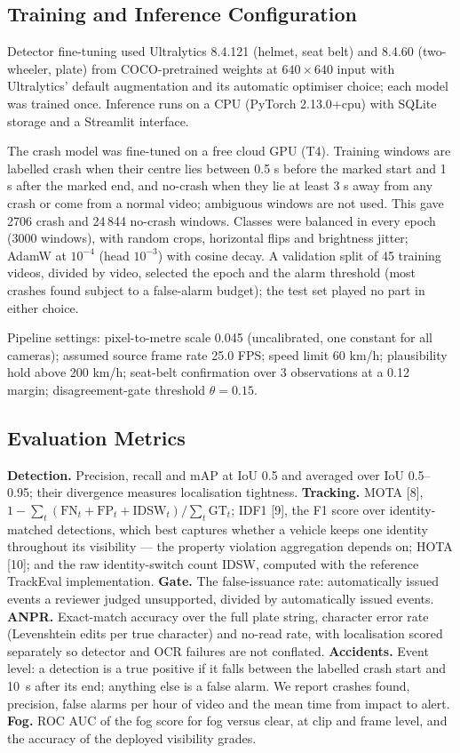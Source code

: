 \documentclass[10pt,a4paper,twocolumn]{article}
\begin{document}
\subsection{Training and Inference Configuration}
Detector fine-tuning used Ultralytics 8.4.121 (helmet, seat belt) and 8.4.60 (two-wheeler, plate) from COCO-pretrained
weights at $640\times640$ input with Ultralytics' default augmentation and its automatic optimiser choice; each model
was trained once. Inference runs on a CPU (PyTorch 2.13.0+cpu) with SQLite storage and a Streamlit interface.

The crash model was fine-tuned on a free cloud GPU (T4). Training windows are labelled crash when their centre lies
between 0.5 s before the marked start and 1 s after the marked end, and no-crash when they lie at least 3 s away from
any crash or come from a normal video; ambiguous windows are not used. This gave 2706 crash and 24\,844 no-crash
windows. Classes were balanced in every epoch (3000 windows), with random crops, horizontal flips and brightness
jitter; AdamW at $10^{-4}$ (head $10^{-3}$) with cosine decay. A validation split of 45 training videos, divided by
video, selected the epoch and the alarm threshold (most crashes found subject to a false-alarm budget); the test set
played no part in either choice.

Pipeline settings: pixel-to-metre scale 0.045 (uncalibrated, one constant for all cameras); assumed source frame rate
25.0 FPS; speed limit 60 km/h; plausibility hold above 200 km/h; seat-belt confirmation over 3 observations at a 0.12
margin; disagreement-gate threshold $\theta = 0.15$.

\subsection{Evaluation Metrics}
\textbf{Detection.} Precision, recall and mAP at IoU 0.5 and averaged over IoU 0.5--0.95; their divergence measures
localisation tightness.
\textbf{Tracking.} MOTA [8], $1-\sum_t(\mathrm{FN}_t+\mathrm{FP}_t+\mathrm{IDSW}_t)/\sum_t\mathrm{GT}_t$; IDF1 [9],
the F1 score over identity-matched detections, which best captures whether a vehicle keeps one identity throughout its
visibility --- the property violation aggregation depends on; HOTA [10]; and the raw identity-switch count IDSW,
computed with the reference TrackEval implementation.
\textbf{Gate.} The false-issuance rate: automatically issued events a reviewer judged unsupported, divided by
automatically issued events.
\textbf{ANPR.} Exact-match accuracy over the full plate string, character error rate (Levenshtein edits per true
character) and no-read rate, with localisation scored separately so detector and OCR failures are not conflated.
\textbf{Accidents.} Event level: a detection is a true positive if it falls between the labelled crash start and
10~s after its end; anything else is a false alarm. We report crashes found, precision, false alarms per hour of video
and the mean time from impact to alert.
\textbf{Fog.} ROC AUC of the fog score for fog versus clear, at clip and frame level, and the accuracy of the deployed
visibility grades.
\end{document}
